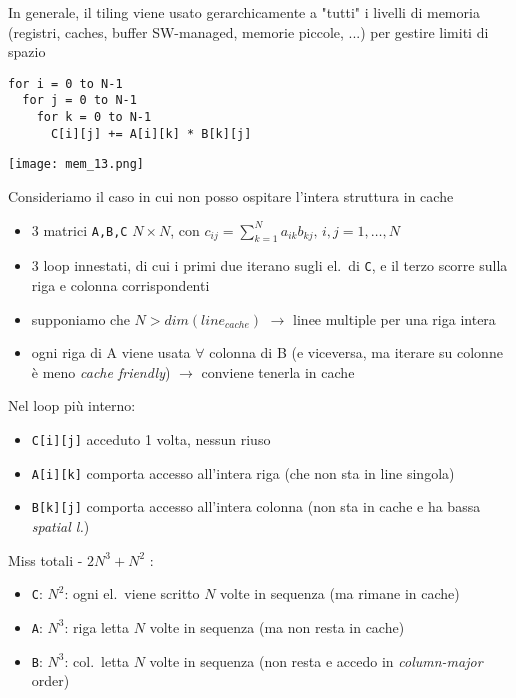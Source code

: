 \begin{emphasize-blue}
  In generale, il tiling viene usato gerarchicamente a "tutti" i livelli di memoria (registri, caches, buffer SW-managed, memorie piccole, ...) per gestire limiti di spazio
\end{emphasize-blue}
\begin{example}[frametitle={Esempio: Matrix multiplication}]

  \noindent \begin{minipage}[]{.5\textwidth}
  \begin{lstlisting}
for i = 0 to N-1
  for j = 0 to N-1
    for k = 0 to N-1
      C[i][j] += A[i][k] * B[k][j]\end{lstlisting}
  \end{minipage}\hfill
  \begin{minipage}[c]{.4\textwidth}
  \texttt{[image: mem\_13.png]}
  \end{minipage}
  
  Consideriamo il caso in cui non posso ospitare l'intera struttura in cache
  \begin{itemize}
    \item 3 matrici \lstinline|A,B,C| $N\times N$, con $c_{ij}=\sum_{k=1}^{N}a_{ik}b_{kj},\, i,j=1,\ldots,N$
    \item 3 loop innestati, di cui i primi due iterano sugli el.~di \lstinline|C|, e il terzo scorre sulla riga e colonna corrispondenti
    \item supponiamo che $N > dim(line_{cache})$ $\rightarrow$ linee multiple per una riga intera
    \item ogni riga di A viene usata $\forall$ colonna di B (e viceversa, ma iterare su colonne \`e meno \textit{cache friendly}) $\rightarrow$ conviene tenerla in cache
\end{itemize}

  Nel loop pi\`u interno:
  \begin{itemize}
    \item \lstinline|C[i][j]| acceduto 1 volta, nessun riuso
    \item \lstinline|A[i][k]| comporta accesso all'intera riga (che non sta in line singola)
    \item \lstinline|B[k][j]| comporta accesso all'intera colonna (non sta in cache e ha bassa \textit{spatial l.})
  \end{itemize}
  Miss totali - $\boxed{2N^3 + N^2}$ :
  \begin{itemize}
    \item \lstinline|C|: $N^{2}$: ogni el.~viene scritto $N$ volte in sequenza (ma rimane in cache)
    \item \lstinline|A|: $N^{3}$: riga letta $N$ volte in sequenza (ma non resta in cache)
    \item \lstinline|B|: $N^{3}$: col.~letta $N$ volte in sequenza (non resta e accedo in \textit{column-major} order)
  \end{itemize}


\end{example}
